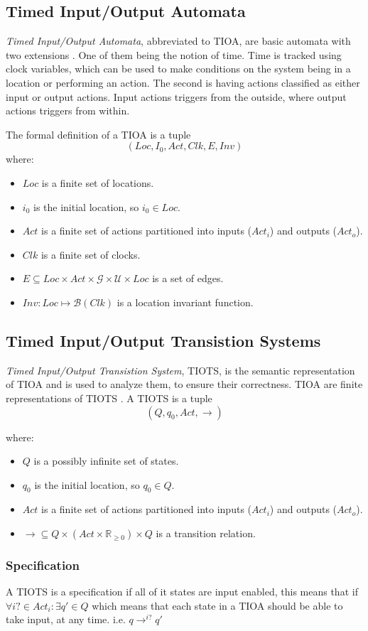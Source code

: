 \subsection{Timed Input/Output Automata}\label{sec:TIOA}
\emph{Timed Input/Output Automata}, abbreviated to TIOA, are basic automata with two extensions \cite{ecdartheory}. One of them being the notion of time. Time is tracked using clock variables, which can be used to make conditions on the system being in a location or performing an action. The second is having actions classified as either input or output actions. Input actions triggers from the outside, where output actions triggers from within. 

The formal definition of a TIOA is a tuple \cite{ecdartheory} $$(Loc, I_{0}, Act, Clk, E, Inv)$$  
where:

\begin{itemize}
    \item $Loc$ is a finite set of locations.
    \item $i_{0}$ is the initial location, so $i_{0} \in Loc$.
    \item $Act$ is a finite set of actions partitioned into inputs ($Act_{i}$) and outputs ($Act_{o}$).
    \item $Clk$ is a finite set of clocks.
    \item $E \subseteq Loc \times Act \times \mathcal{G} \times \mathcal{U} \times Loc$ is a set of edges.
    \item $Inv : Loc \mapsto \mathcal{B}(Clk)$ is a location invariant function. 
\end{itemize}

\subsection{Timed Input/Output Transistion Systems}\label{sec:TIOTS}

\emph{Timed Input/Output Transistion System}, TIOTS, is the semantic representation of TIOA and is used to analyze them, to ensure their correctness. TIOA are finite representations of TIOTS \cite{}. A TIOTS is a tuple \cite{}  $$(Q, q_{0}, Act, \rightarrow)$$

where:

\begin{itemize}
    \item $Q$ is a possibly infinite set of states.
    \item $q_{0}$ is the initial location, so $q_{0} \in Q$.
    \item $Act$ is a finite set of actions partitioned into inputs ($Act_{i}$) and outputs ($Act_{o}$).
    \item $\rightarrow \subseteq Q \times (Act \times \mathbb{R}_{\geq 0}) \times Q$ is a transition relation.
\end{itemize}

\subsubsection{Specification}
A TIOTS is a specification if all of it states are input enabled, this means that if $\forall i? \in Act_i : \exists q' \in Q$ which means that each state in a TIOA should be able to take input, at any time. i.e. $q \rightarrow^{i?} q'$\cite{}